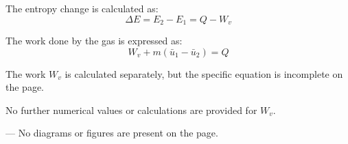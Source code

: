 The entropy change is calculated as:  
\[
\Delta E = E_2 - E_1 = Q - W_v
\]  

The work done by the gas is expressed as:  
\[
W_v + m (\bar{u}_1 - \bar{u}_2) = Q
\]  

The work \( W_v \) is calculated separately, but the specific equation is incomplete on the page.  

No further numerical values or calculations are provided for \( W_v \).  

---  
No diagrams or figures are present on the page.